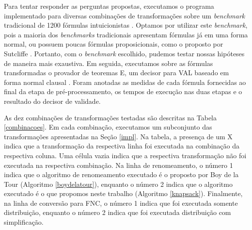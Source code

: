 \indent

Para tentar responder as perguntas propostas, executamos o programa implementado para diversas combinações de transformações sobre um \textit{benchmark} tradicional de 1200 fórmulas intuicionistas \cite{raths07jar}. Optamos por utilizar este \emph{benchmark}, pois a maioria dos \emph{benchmarks} tradicionais apresentam fórmulas já em uma forma normal, ou possuem poucas fórmulas proposicionais, como o proposto por Sutcliffe \cite{sutcliffe09jar}. Portanto, com o \textit{benchmark} escolhido, pudemos testar nossas hipóteses de maneira mais exaustiva. Em seguida, executamos sobre as fórmulas transformadas o provador de teoremas E, um decisor para VAL baseado em forma normal clausal \cite{Schulz:LPAR-2013}. Foram anotadas as medidas de cada fórmula fornecidas ao final da etapa de pré-processamento, os tempos de execução nas duas etapas e o resultado do decisor de validade.

As dez combinações de transformações testadas são descritas na Tabela \ref{combinacoes}. Em cada combinação, executamos um subconjunto das transformações apresentadas na Seção \ref{impl}. Na tabela, a presença de um X indica que a transformação da respectiva linha foi executada na combinação da respectiva coluna. Uma célula vazia indica que a respectiva transformação não foi executada na respectiva combinação. Na linha de renomeamento, o número 1 indica que o algoritmo de renomeamento executado é o proposto por Boy de la Tour (Algoritmo \ref{boydelatour}), enquanto o número 2 indica que o algoritmo executado é o que propomos neste trabalho (Algoritmo \ref{knapsack}). Finalmente, na linha de conversão para FNC, o número 1 indica que foi executada somente distribuição, enquanto o número 2 indica que foi executada distribuição com simplificação.


